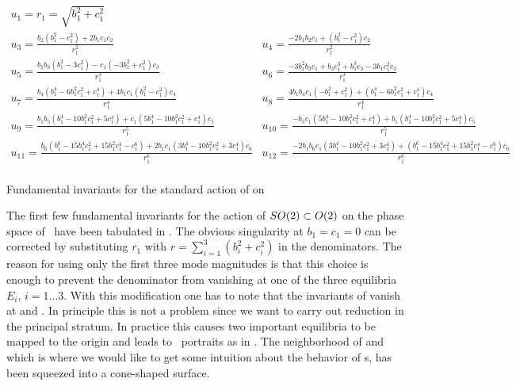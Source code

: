 \begin{table}[t]
\[
\begin{array}{ll}
  u_1=r_1=\sqrt{b_1^2+c_1^2}&  \\ u_3=\frac{b_2 \left(b_1^2-c_1^2\right)+2 b_1 c_1 c_2}{r_1^2}&u_4=\frac{-2
b_1 b_2 c_1+\left(b_1^2-c_1^2\right) c_2}{r_1^2}\\ u_5=\frac{b_1 b_3 \left(b_1^2-3 c_1^2\right)-c_1 \left(-3
b_1^2+c_1^2\right) c_3}{r_1^3}&u_6=\frac{-3 b_1^2 b_3 c_1+b_3 c_1^3+b_1^3 c_3-3 b_1 c_1^2 c_3}{r_1^3}\\ u_7=\frac{b_4
\left(b_1^4-6 b_1^2 c_1^2+c_1^4\right)+4 b_1 c_1 \left(b_1^2-c_1^2\right) c_4}{r_1^4}&u_8=\frac{4 b_1
b_4 c_1 \left(-b_1^2+c_1^2\right)+\left(b_1^4-6 b_1^2 c_1^2+c_1^4\right) c_4}{r_1^4}\\ u_9=\frac{b_1
b_5 \left(b_1^4-10 b_1^2 c_1^2+5 c_1^4\right)+c_1 \left(5 b_1^4-10 b_1^2 c_1^2+c_1^4\right) c_5}{r_1^5}&u_{10}=\frac{-b_5
c_1 \left(5 b_1^4-10 b_1^2 c_1^2+c_1^4\right)+b_1 \left(b_1^4-10 b_1^2 c_1^2+5 c_1^4\right) c_5}{r_1^5}\\ u_{11}=\frac{b_6
\left(b_1^6-15 b_1^4 c_1^2+15 b_1^2 c_1^4-c_1^6\right)+2 b_1 c_1 \left(3 b_1^4-10 b_1^2 c_1^2+3 c_1^4\right) c_6}{r_1^6}&u_{12}=\frac{-2
b_1 b_6 c_1 \left(3 b_1^4-10 b_1^2 c_1^2+3 c_1^4\right)+\left(b_1^6-15 b_1^4 c_1^2+15 b_1^2 c_1^4-c_1^6\right) c_6}{r_1^6}\\
\end{array}
\]
\caption[Fundamental invariants for SO(2), n=6.]{Fundamental invariants for the standard action of  on }
\label{tab:SO2n6}
\end{table}

The first few fundamental invariants for the action  of $SO(2)\subset O(2)$ on the phase space of \KSe\ have been tabulated in . The obvious singularity at $b_1=c_1=0$ can be
corrected by substituting $r_1$ with $r=\sum_{i=1}^3 (b_i^2+c_i^2)$ in the denominators. The reason
for using only the first three mode magnitudes is that this choice is enough to prevent the denominator from vanishing at one of the three equilibria $E_i$, $i=1\ldots3$. With this modification one has to note that the invariants of  vanish at  and . In principle this is not a problem since we want to carry out reduction in the principal stratum. In practice this causes two important equilibria to be mapped to the origin and leads to \statesp\ portraits as in . The neighborhood of  and  which is where we would like to get some intuition about the behavior of \rpo s, has been squeezed into a cone-shaped surface.

